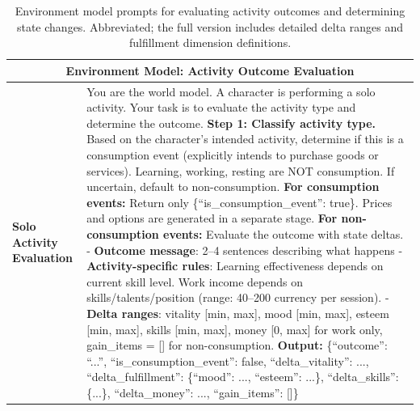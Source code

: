 \begin{table}[h]
\centering
\caption{Environment model prompts for evaluating activity outcomes and determining state changes. Abbreviated; the full version includes detailed delta ranges and fulfillment dimension definitions.}
\label{tab:prompts_god_eval}
\begin{tabular}{p{0.8in}p{4.3in}}
\toprule
\multicolumn{2}{c}{\textbf{Environment Model: Activity Outcome Evaluation}} \\
\midrule

\textbf{Solo \newline Activity \newline Evaluation} &

You are the world model. A character is performing a solo activity. Your task is to evaluate the activity type and determine the outcome.
\vspace{4pt}\newline
\textbf{Step 1: Classify activity type.} Based on the character's intended activity, determine if this is a consumption event (explicitly intends to purchase goods or services). Learning, working, resting are NOT consumption. If uncertain, default to non-consumption.
\vspace{4pt}\newline
\textbf{For consumption events:}
\newline Return only \{``is\_consumption\_event'': true\}. Prices and options are generated in a separate stage.
\vspace{4pt}\newline
\textbf{For non-consumption events:} Evaluate the outcome with state deltas.
\newline - \textbf{Outcome message}: 2--4 sentences describing what happens
\newline - \textbf{Activity-specific rules}: Learning effectiveness depends on current skill level. Work income depends on skills/talents/position (range: 40--200 currency per session).
\newline - \textbf{Delta ranges}: vitality [min, max], mood [min, max], esteem [min, max], skills [min, max], money [0, max] for work only, gain\_items = [] for non-consumption.
\vspace{4pt}\newline
\textbf{Output:} \{``outcome'': ``...'', ``is\_consumption\_event'': false, ``delta\_vitality'': ..., ``delta\_fulfillment'': \{``mood'': ..., ``esteem'': ...\}, ``delta\_skills'': \{...\}, ``delta\_money'': ..., ``gain\_items'': []\}


\end{tabular}
\end{table}
